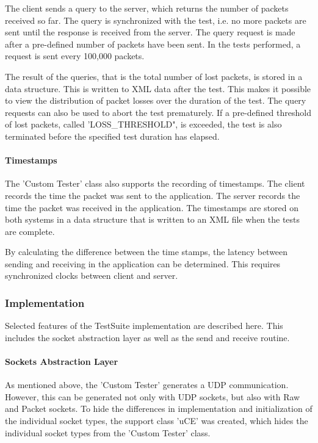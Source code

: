 The client sends a query to the server, which returns the number of packets received so far. The query is synchronized with the test, i.e. no more packets are sent until the response is received from the server. The query request is made after a pre-defined number of packets have been sent. In the tests performed, a request is sent every 100,000 packets.

The result of the queries, that is the total number of lost packets, is stored in a data structure. This is written to XML data after the test. This makes it possible to view the distribution of packet losses over the duration of the test. The query requests can also be used to abort the test prematurely. If a pre-defined threshold of lost packets, called 'LOSS\_THRESHOLD", is exceeded, the test is also terminated before the specified test duration has elapsed.

\paragraph{Timestamps}
The 'Custom Tester' class also supports the recording of timestamps. The client records the time the packet was sent to the application. The server records the time the packet was received in the application. The timestamps are stored on both systems in a data structure that is written to an XML file when the tests are complete.

By calculating the difference between the time stamps, the latency between sending and receiving in the application can be determined. This requires synchronized clocks between client and server.

\subsubsection{Implementation}
Selected features of the TestSuite implementation are described here. This includes the socket abstraction layer as well as the send and receive routine.

\paragraph{Sockets Abstraction Layer}
As mentioned above, the 'Custom Tester' generates a UDP communication. However, this can be generated not only with UDP sockets, but also with Raw and Packet sockets. To hide the differences in implementation and initialization of the individual socket types, the support class 'uCE' was created, which hides the individual socket types from the 'Custom Tester' class.

